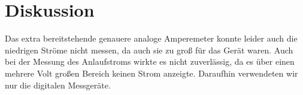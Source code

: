 \documentclass[12pt,a4paper,titlepage,headinclude,bibtotoc]{scrartcl}
\begin{document}
\section{Diskussion}
\label{sec:diskussion}
Das extra bereitstehende genauere analoge Amperemeter konnte leider auch die niedrigen Ströme nicht messen, da auch sie zu groß für das Gerät waren.
Auch bei der Messung des Anlaufstroms wirkte es nicht zuverlässig, da es über einen mehrere Volt großen Bereich keinen Strom anzeigte.
Daraufhin verwendeten wir nur die digitalen Messgeräte.



\end{document}
